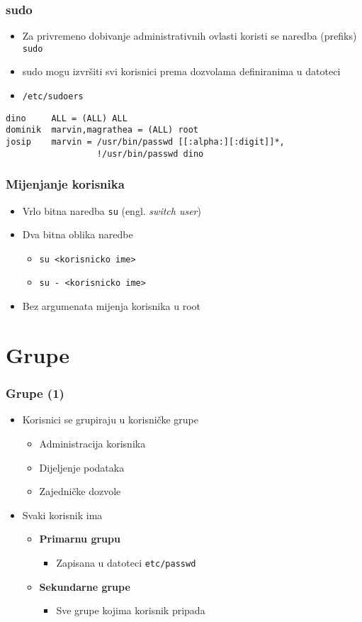 \documentclass[table,usenames,dvipsnames] {beamer}
\newcommand{\shell}[1]{\texttt{#1}}
\begin{document}
\begin{frame}[fragile]
\frametitle{sudo}
\begin{itemize}
  \item Za privremeno dobivanje administrativnih ovlasti koristi se naredba (prefiks) \shell{sudo}
  \item sudo mogu izvršiti svi korisnici prema dozvolama definiranima u datoteci
  \item[] {\small\shell{/etc/sudoers}}
\end{itemize}
\vfill
\footnotesize
\begin{Verbatim}
dino     ALL = (ALL) ALL
dominik  marvin,magrathea = (ALL) root
josip    marvin = /usr/bin/passwd [[:alpha:][:digit]]*,
                  !/usr/bin/passwd dino
\end{Verbatim}
\end{frame}

\begin{frame}[t]
\frametitle{Mijenjanje korisnika} 
\begin{itemize}
  \item Vrlo bitna naredba \shell{su} (engl. \emph{switch user})
  \item Dva bitna oblika naredbe
  \begin{itemize}
    \item \shell{su <korisnicko ime>}
    \item \shell{su - <korisnicko ime>}
  \end{itemize}
  \item Bez argumenata mijenja korisnika u root
\end{itemize}
\end{frame}

\section{Grupe}
\begin{frame}[t]
\frametitle{Grupe (1)}
\begin{itemize}
  \item Korisnici se grupiraju u korisničke grupe
  \begin{itemize}
  	\item Administracija korisnika
  	\item Dijeljenje podataka
  	\item Zajedničke dozvole
  \end{itemize}
  \item Svaki korisnik ima
  \begin{itemize}
    \item[] \textbf{Primarnu grupu}
    \begin{itemize}
      \item Zapisana u datoteci \shell{etc/passwd} 
    \end{itemize}
    \item[] \textbf{Sekundarne grupe}
    \begin{itemize}
      \item  Sve grupe kojima korisnik pripada
    \end{itemize}
  \end{itemize}
\end{itemize}
\end{frame}
\end{document}
